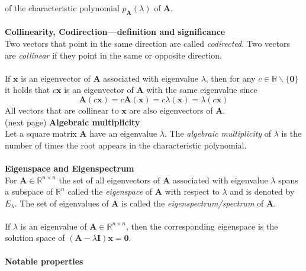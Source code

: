 \documentclass{report}
\begin{document}
of the characteristic polynomial $p_{\bm{A}}(\lambda)$ of $\bm{A}$.\\
\vspace{1mm}\\
\textbf{Collinearity, Codirection---definition and significance}\\
Two vectors that point in the same direction are called \textit{codirected}. Two vectors are \textit{collinear} if
they point in the same or opposite direction.\\
\vspace{1mm}\\
If $\bm{x}$ is an eigenvector of $\bm{A}$ associated with eigenvalue $\lambda$, then for any 
$c\in\mathbb{R}\backslash\{\bm{0}\}$ it holds that $c\bm{x}$ is an eigenvector of 
$\bm{A}$ with the same eigenvalue since
\begin{equation*}
\bm{A}(c\bm{x})=c\bm{A}(\bm{x})=c\lambda(\bm{x})
=\lambda(c\bm{x})
\end{equation*}
All vectors that are collinear to $\bm{x}$ are also eigenvectors of $\bm{A}$.\\
(next page)
\newpage
\noindent\textbf{Algebraic multiplicity}\\
Let a square matrix $\bm{A}$ have an eigenvalue $\lambda$. The \textit{algebraic multiplicity} of $\lambda$ is
the number of times the root appears in the characteristic polynomial.\\
\vspace{1mm}\\
\textbf{Eigenspace and Eigenspectrum}\\
For $\bm{A}\in\mathbb{R}^{n\times n}$ the set of all eigenvectors of $\bm{A}$ associated with eigenvalue 
$\lambda$ spans a subspace of $\mathbb{R}^n$ called the \textit{eigenspace} of $\bm{A}$ with respect to 
$\lambda$ and is denoted by $E_\lambda$. The set of eigenvalues of $\bm{A}$ is called the 
\textit{eigenspectrum/spectrum} of $\bm{A}$.\\
\vspace{1mm}\\
If $\lambda$ is an eigenvalue of $\bm{A}\in\mathbb{R}^{n\times n}$, then the corresponding eigenspace is the 
solution space of $(\bm{A}-\lambda\bm{I})\bm{x}=\bm{0}$. 
\\
\vspace{1mm}\\
\textbf{Notable properties}
\end{document}
